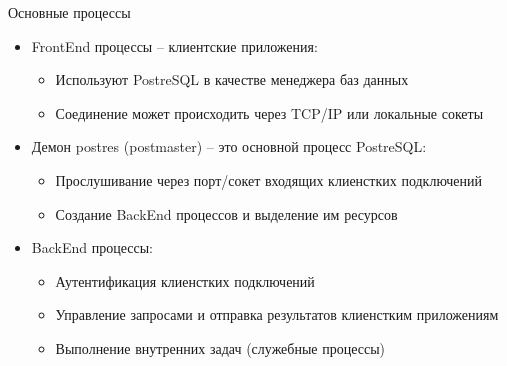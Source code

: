 \documentclass[12pt]{article}
\begin{document}
\begin{nota}{Основные процессы}
    \begin{itemize}
        \item FrontEnd процессы -- клиентские приложения:
        
        \begin{itemize}
            \item Используют PostreSQL в качестве менеджера баз данных
            \item Соединение может происходить через TCP/IP или локальные сокеты 
        \end{itemize}

        \item Демон postres (postmaster) -- это основной процесс PostreSQL:
        
        \begin{itemize}
            \item Прослушивание через порт/сокет входящих клиенстких подключений
            \item Создание BackEnd процессов и выделение им ресурсов
        \end{itemize}

        \item BackEnd процессы:
        
        \begin{itemize}
            \item Аутентификация клиенстких подключений 
            \item Управление запросами и отправка результатов клиенстким приложениям 
            \item Выполнение внутренних задач (служебные процессы)
        \end{itemize}
    \end{itemize}
\end{nota}
\end{document}
